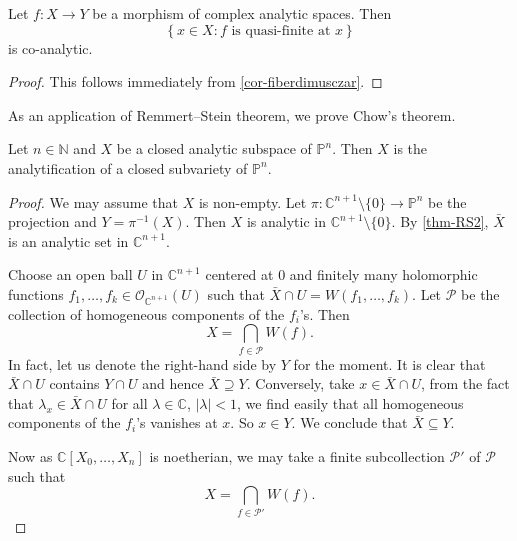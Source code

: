 \begin{corollary}\label{cor-quasifinitelocuscoana}
    Let $f:X\rightarrow Y$ be a morphism of complex analytic spaces. Then
    \[
        \left\{x\in X: f\text{ is quasi-finite at }x\right\}  
    \] 
    is co-analytic.
\end{corollary}
\begin{proof}
    This follows immediately from \cref{cor-fiberdimusczar}.
\end{proof}

As an application of Remmert--Stein theorem, we prove Chow's theorem.

\begin{thm}
    Let $n\in \mathbb{N}$ and $X$ be a closed analytic subspace of $\mathbb{P}^n$. Then $X$ is the analytification of a closed subvariety of $\mathbb{P}^n$.
\end{thm}
\begin{proof}
    We may assume that $X$ is non-empty.
    Let $\pi:\mathbb{C}^{n+1}\setminus\{0\}\rightarrow \mathbb{P}^n$ be the projection and $Y=\pi^{-1}(X)$. Then $X$ is analytic in $\mathbb{C}^{n+1}\setminus\{0\}$. By \cref{thm-RS2}, $\bar{X}$ is an analytic set in $\mathbb{C}^{n+1}$.

    Choose an open ball $U$ in $\mathbb{C}^{n+1}$ centered at $0$ and finitely many holomorphic functions $f_1,\ldots,f_k\in \mathcal{O}_{\mathbb{C}^{n+1}}(U)$ such that $\bar{X}\cap U=W(f_1,\ldots,f_k)$. 
    Let $\mathcal{P}$ be the collection of homogeneous components of the $f_i$'s. Then
    \[
        X=\bigcap_{f\in \mathcal{P}}W(f).  
    \]
    In fact, let us denote the right-hand side by $Y$ for the moment.
    It is clear that $\bar{X}\cap U$ contains $Y\cap U$ and hence $\bar{X}\supseteq Y$. Conversely, take $x\in \bar{X}\cap U$, from the fact that $\lambda_x\in \bar{X}\cap U$ for all $\lambda\in \mathbb{C}$, $|\lambda|<1$, we find easily that all homogeneous components of the $f_i$'s vanishes at $x$. So $x\in Y$. We conclude that $\bar{X}\subseteq Y$.

    Now as $\mathbb{C}[X_0,\ldots,X_n]$ is noetherian, we may take a finite subcollection $\mathcal{P}'$ of $\mathcal{P}$ such that 
    \[
        X=\bigcap_{f\in \mathcal{P}'}W(f). 
    \]
\end{proof}

\cite{stacks-project}

\printbibliography
